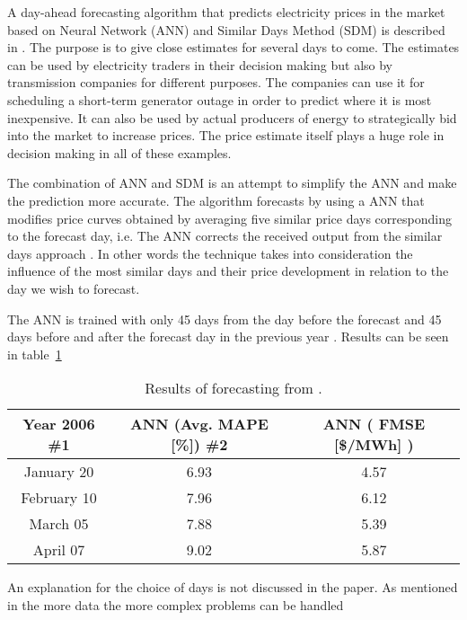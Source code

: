 A day-ahead forecasting algorithm that predicts electricity prices in the market based on Neural Network (ANN) and Similar Days Method (SDM) is described in \cite{pjmForecast}. The purpose is to give close estimates for several days to come. The estimates can be used by electricity traders in their decision making but also by transmission companies for different purposes. The companies can use it for scheduling a short-term generator outage in order to predict where it is most inexpensive. It can also be used by actual producers of energy to strategically bid into the market to increase prices. The price estimate itself plays a huge role in decision making in all of these examples.

The combination of ANN and SDM is an attempt to simplify the ANN and make the prediction more accurate. The algorithm forecasts by using a ANN that modifies price curves obtained by averaging five similar price days corresponding to the forecast day, i.e. The ANN corrects the received output from the similar days approach \cite{pjmForecast}. In other words the technique takes into consideration the influence of the most similar days and their price development in relation to the day we wish to forecast.

The ANN is trained with only 45 days from the day before the forecast and 45 days before and after the forecast day in the previous year \cite{pjmForecast}. Results can be seen in table~\ref{table:sdmresult}

\begin{table}[h!]
\centering  %
\begin{tabular}{c c c} %
Year 2006 \#1 & ANN (Avg. MAPE [\%]) \#2 & ANN ( FMSE [\$/MWh] ) \\ [0.5ex] %
\hline                  %
January 20 & 6.93 & 4.57  \\ %
February 10 & 7.96 & 6.12  \\
March 05 & 7.88 & 5.39  \\
April 07 & 9.02 & 5.87 \\ [1ex] %
\hline %
\end{tabular}
\caption{Results of forecasting from \cite{pjmForecast}.} %
\label{table:sdmresult} %
\end{table}


An explanation for the choice of days is not discussed in the paper. As  mentioned in \cite{18} the more data the more complex problems can be handled

